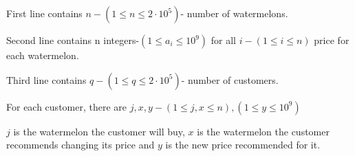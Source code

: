 First line contains $n-(1 \le n \le 2 \cdot 10^5)$- number of watermelons.

Second line contains n integers-$(1\le a_i \le 10^9)$ for all $i-(1\le i\le n)$ price for each watermelon.

Third line contains $q-(1 \le q \le 2 \cdot 10^5)$- number of customers.

For each customer, there are $j,x,y-(1\le j,x \le n),(1\le y \le 10^9)$

$j$ is the watermelon the customer will buy, $x$ is the watermelon the customer recommends changing its price and $y$ is the new price recommended for it.